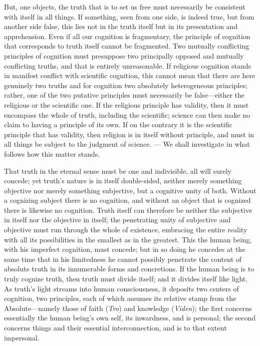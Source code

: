 \documentclass[12pt,a4paper]{article}
\begin{document}
But, one objects, the truth that is to set us free must necessarily be
consistent with itself in all things. If something, seen from one side,
is indeed true, but from another side false, this lies not in the truth
itself but in its presentation and apprehension. Even if all our
cognition is fragmentary, the principle of cognition that corresponds
to truth itself cannot be fragmented. Two mutually conflicting
principles of cognition must presuppose two principally opposed and
mutually conflicting truths, and that is entirely unreasonable. If
religious cognition stands in manifest conflict with scientific
cognition, this cannot mean that there are here genuinely two truths
and for cognition two absolutely heterogeneous principles; rather, one
of the two putative principles must necessarily be false---either the
religious or the scientific one. If the religious principle has
validity, then it must encompass the whole of truth, including the
scientific; science can then make no claim to having a principle of its
own. If on the contrary it is the scientific principle that has
validity, then religion is in itself without principle, and must in all
things be subject to the judgment of science. --- We shall investigate
in what follows how this matter stands.

That truth in the eternal sense must be one and indivisible, all will
surely concede; yet truth's nature is in itself double-sided, neither
merely something objective nor merely something subjective, but a
cognitive unity of both. Without a cognizing subject there is no
cognition, and without an object that is cognized there is likewise no
cognition. Truth itself can therefore be neither the subjective in
itself nor the objective in itself; the penetrating unity of subjective
and objective must run through the whole of existence, embracing the
entire reality with all its possibilities in the smallest as in the
greatest. This the human being, with his imperfect cognition, must
concede; but in so doing he concedes at the same time that in his
limitedness he cannot possibly penetrate the content of absolute truth
in its innumerable forms and concretions. If the human being is to
truly cognize truth, then truth must divide itself; and it divides
itself like light. As truth's light streams into human consciousness,
it deposits two centers of cognition, two principles, each of which
assumes its relative stamp from the Absolute---namely those of faith
(\emph{Tro}) and knowledge (\emph{Viden}); the first concerns
essentially the human being's own self, its inwardness, and is
personal; the second concerns things and their essential interconnection,
and is to that extent impersonal.
\end{document}
